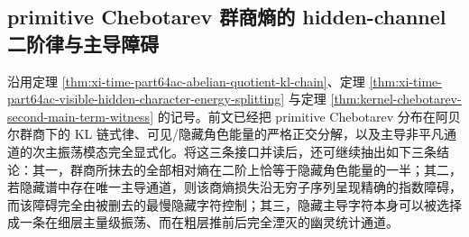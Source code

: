 \subsection{primitive Chebotarev 群商熵的 hidden-channel 二阶律与主导障碍}\label{subsec:conclusion-chebotarev-hiddenchannel-entropy-barrier}

沿用定理 \ref{thm:xi-time-part64ac-abelian-quotient-kl-chain}、定理 \ref{thm:xi-time-part64ac-visible-hidden-character-energy-splitting} 与定理 \ref{thm:kernel-chebotarev-second-main-term-witness} 的记号。前文已经把 primitive Chebotarev 分布在阿贝尔群商下的 KL 链式律、可见/隐藏角色能量的严格正交分解，以及主导非平凡通道的次主振荡模态完全显式化。将这三条接口并读后，还可继续抽出如下三条结论：其一，群商所抹去的全部相对熵在二阶上恰等于隐藏角色能量的一半；其二，若隐藏谱中存在唯一主导通道，则该商熵损失沿无穷子序列呈现精确的指数障碍，而该障碍完全由被删去的最慢隐藏字符控制；其三，隐藏主导字符本身可以被选择成一条在细层主量级振荡、而在粗层推前后完全湮灭的幽灵统计通道。

